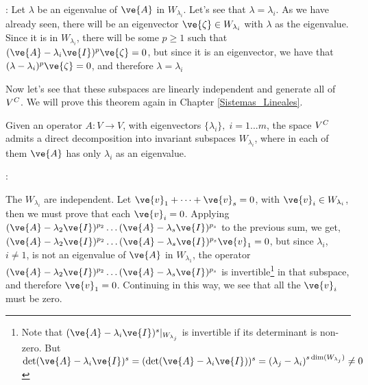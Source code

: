 \pru: Let $\lambda$ be an eigenvalue of $\ve{A}$ in $W_{\lambda_i}$. 
Let's see that $\lambda = \lambda_i$. 
As we have already seen, there will be an eigenvector $\ve{\zeta} \in W_{\lambda_i}$ 
with $\lambda$ as the eigenvalue.
Since it is in $W_{\lambda_i}$, there will be some $p \geq 1$ such that 
$(\ve{A} - \lambda_i \ve{I})^p \ve{\zeta} = 0$, but since it is an eigenvector, we have that
$(\lambda - \lambda_i)^p \ve{\zeta} = 0$, and therefore $\lambda = \lambda_i$
\epru
\espa

Now let's see that these subspaces are linearly independent and generate
all of $V^{C}$. 
We will prove this theorem again in Chapter \ref{Sistemas_Lineales}.

Given an operator $A: V \to V$, with eigenvectors $\{ \lambda_i \}, \; i=1...m$, 
the space $V^{C}$ admits a direct decomposition into invariant subspaces 
$W_{\lambda_i}$,
where in each of them $\ve{A}$ has only $\lambda_i$ as an eigenvalue.
\eteo

\pru:

The $W_{\lambda_i}$ are independent. 
Let $\ve{v}_1 + \dots + \ve{v}_s = 0$, with
$\ve{v}_i \in W_{\lambda_i}$, then we must prove that each $\ve{v}_i=0$.
Applying 
$(\ve{A} - \lambda_2 \ve{I})^{p_2}\dots (\ve{A} - \lambda_s \ve{I})^{p_s}$
to the previous sum, we get,
$(\ve{A} - \lambda_2 \ve{I})^{p_2}\dots (\ve{A} - \lambda_s \ve{I})^{p_s}\ve{v}_1 =0$,
but since $\lambda_i$, $i \neq 1$, is not an eigenvalue of $\ve{A}$ in $W_{\lambda_1}$,
the operator 
$(\ve{A} - \lambda_2 \ve{I})^{p_2}\dots (\ve{A} - \lambda_s \ve{I})^{p_s}$ is 
invertible\footnote{
Note that $(\ve{A} - \lambda_i \ve{I})^{s}|_{W_{\lambda_j}}$ 
is invertible if its determinant is non-zero. 
But 
$\det (\ve{A} - \lambda_i \ve{I})^{s} = (\det(\ve{A} - \lambda_i \ve{I}))^s 
= (\lambda_j - \lambda_i)^{s \dim (W_{\lambda_j})} \neq 0$
}
in that subspace, and therefore $\ve{v}_1 =0$. Continuing in this way, we see that all
the $\ve{v}_i$ must be zero.

